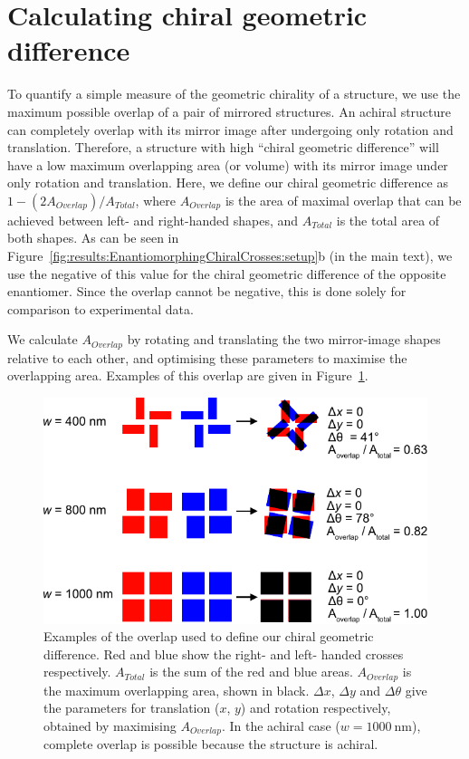 \section{Calculating chiral geometric difference}\label{sec:appendix:ChiralGeoDiff}

To quantify a simple measure of the geometric chirality of a structure, we use the maximum possible overlap of a pair of mirrored structures. An achiral structure can completely overlap with its mirror image after undergoing only rotation and translation. Therefore, a structure with high ``chiral geometric difference'' will have a low maximum overlapping area (or volume) with its mirror image under only rotation and translation. Here, we define our chiral geometric difference as $1 - (2A_{Overlap}) / A_{Total}$,
where $A_{Overlap}$ is the area of maximal overlap that can be achieved between left- and right-handed shapes, and $A_{Total}$ is the total area of both shapes. 
As can be seen in Figure~\ref{fig:results:EnantiomorphingChiralCrosses:setup}b (in the main text), we use the negative of this value for the chiral geometric difference of the opposite enantiomer. Since the overlap cannot be negative, this is done solely for comparison to experimental data.

We calculate $A_{Overlap}$ by rotating and translating the two mirror-image shapes relative to each other, and optimising these parameters to maximise the overlapping area. Examples of this overlap are given in Figure~\ref{fig:appendix:ChiralGeoDiff}.

\begin{figure}[htb!]	
    \centering	
    \includegraphics[scale=0.8]{./figures/results/EnantiomorphingChiralCrosses/geoDiff.pdf}
    \caption{\label{fig:appendix:ChiralGeoDiff}
    Examples of the overlap used to define our chiral geometric difference. Red and blue show the right- and left- handed crosses respectively.   $A_{Total}$ is the sum of the red and blue areas. $A_{Overlap}$ is the maximum overlapping area, shown in black. $\Delta x$, $\Delta y$ and $\Delta \theta$ give the parameters for translation ($x$, $y$) and rotation respectively, obtained by maximising $A_{Overlap}$. In the achiral case ($w=\SI{1000}{\nano\m}$), complete overlap is possible because the structure is achiral. }	
\end{figure}

